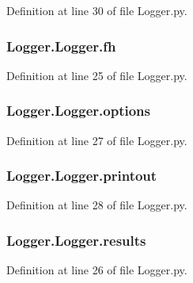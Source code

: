 Definition at line 30 of file Logger.\-py.

\hypertarget{classLogger_1_1Logger_a68875fbff44820c122a69fee38bad238}{
\subsubsection[{fh}]{\setlength{\rightskip}{0pt plus 5cm}Logger.\-Logger.\-fh}}\label{classLogger_1_1Logger_a68875fbff44820c122a69fee38bad238}


Definition at line 25 of file Logger.\-py.

\hypertarget{classLogger_1_1Logger_a8e881dc46a69491fab52e8fca3d8dd59}{
\subsubsection[{options}]{\setlength{\rightskip}{0pt plus 5cm}Logger.\-Logger.\-options}}\label{classLogger_1_1Logger_a8e881dc46a69491fab52e8fca3d8dd59}


Definition at line 27 of file Logger.\-py.

\hypertarget{classLogger_1_1Logger_abd7bd77ec56ae98c25ff4596ae8ee0ea}{
\subsubsection[{printout}]{\setlength{\rightskip}{0pt plus 5cm}Logger.\-Logger.\-printout}}\label{classLogger_1_1Logger_abd7bd77ec56ae98c25ff4596ae8ee0ea}


Definition at line 28 of file Logger.\-py.

\hypertarget{classLogger_1_1Logger_accc7402a4ee718e807f3f60d850d2072}{
\subsubsection[{results}]{\setlength{\rightskip}{0pt plus 5cm}Logger.\-Logger.\-results}}\label{classLogger_1_1Logger_accc7402a4ee718e807f3f60d850d2072}


Definition at line 26 of file Logger.\-py.

